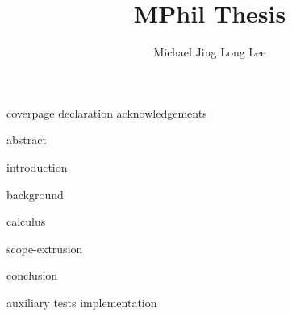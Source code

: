 \documentclass[12pt,a4paper,twoside,openany,BCOR=2cm]{scrbook}
\title{MPhil Thesis}
\author{Michael Jing Long Lee}
\begin{document}


\frontmatter
{

{coverpage}
{declaration}
{acknowledgements}

{abstract}

\hypersetup{linkcolor=black, linkbordercolor=white}
\tableofcontents

 }

\mainmatter
{introduction}

{background}

{calculus}

{scope-extrusion}


{conclusion}



\appendix

{auxiliary}
{tests}
{implementation}
\end{document}
